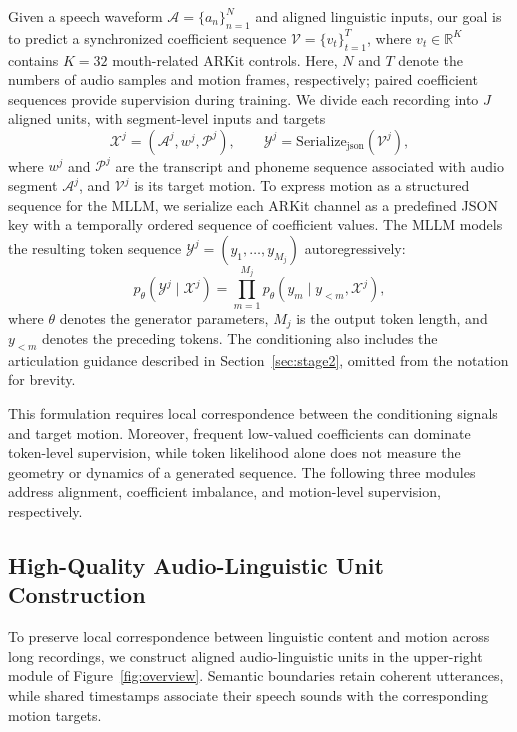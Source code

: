 Given a speech waveform $\mathcal{A}=\{a_n\}_{n=1}^{N}$ and aligned linguistic inputs, our goal is to predict a synchronized coefficient sequence $\mathcal{V}=\{v_t\}_{t=1}^{T}$, where $v_t\in\mathbb{R}^{K}$ contains $K=32$ mouth-related ARKit controls.
Here, $N$ and $T$ denote the numbers of audio samples and motion frames, respectively; paired coefficient sequences provide supervision during training.
We divide each recording into $J$ aligned units, with segment-level inputs and targets
\[
\mathcal{X}^j=(\mathcal{A}^j,w^j,\mathcal{P}^j), \qquad
\mathcal{Y}^j=\mathrm{Serialize}_{\mathrm{json}}(\mathcal{V}^j),
\]
where $w^j$ and $\mathcal{P}^j$ are the transcript and phoneme sequence associated with audio segment $\mathcal{A}^j$, and $\mathcal{V}^j$ is its target motion.
To express motion as a structured sequence for the MLLM, we serialize each ARKit channel as a predefined JSON key with a temporally ordered sequence of coefficient values.
The MLLM models the resulting token sequence $\mathcal{Y}^j=(y_1,\ldots,y_{M_j})$ autoregressively:
\begin{equation}
p_\theta(\mathcal{Y}^j\mid\mathcal{X}^j)
=\prod_{m=1}^{M_j}p_\theta(y_m\mid y_{<m},\mathcal{X}^j),
\label{eq:structured_generation}
\end{equation}
where $\theta$ denotes the generator parameters, $M_j$ is the output token length, and $y_{<m}$ denotes the preceding tokens.
The conditioning also includes the articulation guidance described in Section~\ref{sec:stage2}, omitted from the notation for brevity.

This formulation requires local correspondence between the conditioning signals and target motion.
Moreover, frequent low-valued coefficients can dominate token-level supervision, while token likelihood alone does not measure the geometry or dynamics of a generated sequence.
The following three modules address alignment, coefficient imbalance, and motion-level supervision, respectively.

\subsection{High-Quality Audio-Linguistic Unit Construction}
\label{sec:stage1}

To preserve local correspondence between linguistic content and motion across long recordings, we construct aligned audio-linguistic units in the upper-right module of Figure~\ref{fig:overview}.
Semantic boundaries retain coherent utterances, while shared timestamps associate their speech sounds with the corresponding motion targets.

